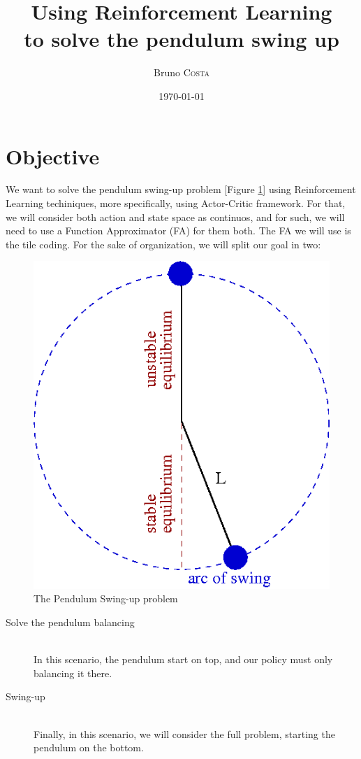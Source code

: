 \documentclass{article}
\title{Using Reinforcement Learning \\ to solve the pendulum swing up} %
\author{Bruno \textsc{Costa}} %
\date{\today} %
\begin{document}
\maketitle %



\section{Objective}

We want to solve the pendulum swing-up problem [Figure \ref{fig:swing}] using Reinforcement Learning techiniques, more specifically, using Actor-Critic framework. For that, we will consider both action and state space as continuos, and for such, we will need to use a Function Approximator (FA) for them both. The FA we will use is the tile coding. For the sake of organization, we will split our goal in two:

\begin{figure}[h!]
    \centering
    \includegraphics[width=.4\textwidth]{swing.png}
    \caption{The Pendulum Swing-up problem}
    \label{fig:swing}
\end{figure}

\begin{description}
\item[Solve the pendulum balancing] \hfill \\
In this scenario, the pendulum start on top, and our policy must only balancing it there.
\item[Swing-up] \hfill \\
Finally, in this scenario, we will consider the full problem, starting the pendulum on the bottom.
\end{description}
\end{document}
